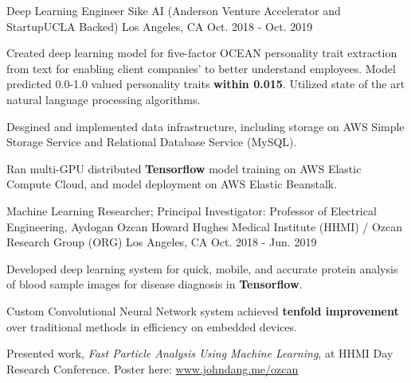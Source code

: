 \begin{cventries}
  \cventry
    {Deep Learning Engineer} %
    {Sike AI (Anderson Venture Accelerator and StartupUCLA Backed)} %
    {Los Angeles, CA} %
    {Oct. 2018 - Oct. 2019} %
    {
      \begin{cvitems} %
        \item {Created deep learning model for five-factor OCEAN personality trait extraction from text for enabling 
        client companies' to better understand employees. Model predicted 0.0-1.0 valued personality traits \textbf{within 0.015}.
        Utilized state of the art natural language processing algorithms.}
        \item {Desgined and implemented data infrastructure, including storage on AWS Simple Storage Service
         and Relational Database Service (MySQL).
        \item Ran multi-GPU distributed \textbf{Tensorflow} model training on AWS Elastic Compute Cloud, and model deployment on AWS Elastic Beanstalk.}
      \end{cvitems}
    }

  \cventry
    {Machine Learning Researcher; Principal Investigator: Professor of Electrical Engineering, Aydogan Ozcan} %
    {Howard Hughes Medical Institute (HHMI) / Ozcan Research Group (ORG)} %
    {Los Angeles, CA} %
    {Oct. 2018 - Jun. 2019} %
    {
      \begin{cvitems} %
        \item {Developed deep learning system for quick, mobile, and accurate protein analysis of blood sample images for disease diagnosis in \textbf{Tensorflow}.}
        \item {Custom Convolutional Neural Network system achieved \textbf{tenfold improvement} over traditional methods in efficiency on embedded devices.}
        \item Presented work, \textit{Fast Particle Analysis Using Machine Learning}, at HHMI Day Research Conference. Poster here: \href{https://www.johndang.me/ozcan}{www.johndang.me/ozcan}
      \end{cvitems}
    }


\end{cventries}
